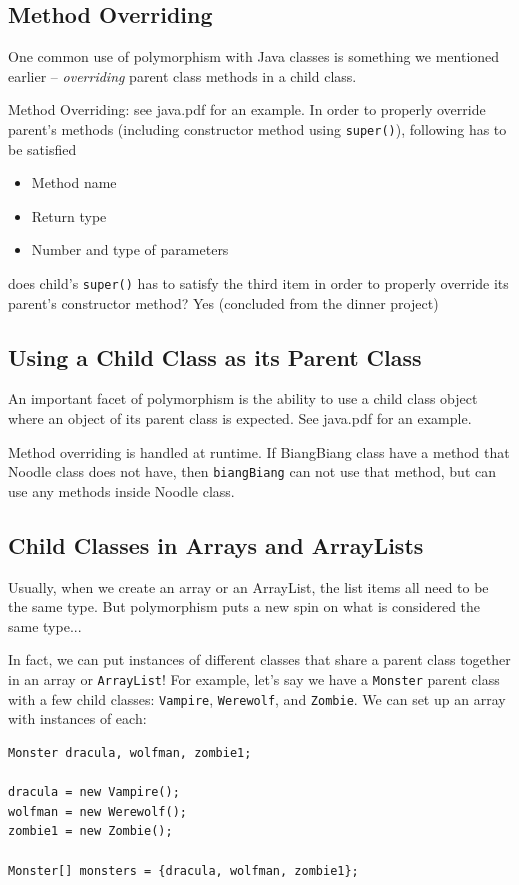 \documentclass[a4paper, 12pt]{article}
\begin{document}
\subsection{Method Overriding}
One common use of polymorphism with Java classes is something we mentioned earlier -- \textit{overriding} parent class methods in a child class.

Method Overriding: see java.pdf for an example. In order to properly override parent's methods {\color{red}(including constructor method using \verb|super()|)}, following has to be satisfied
\begin{itemize}
\item Method name

\item Return type

\item Number and type of parameters

\end{itemize}
does child's \verb|super()| has to satisfy the third item in order to properly override its parent's constructor method? Yes (concluded from the dinner project)

\subsection{Using a Child Class as its Parent Class}
An important facet of polymorphism is the ability to use a child class object where an object of its parent class is expected. See java.pdf for an example.

Method overriding is handled at runtime. If BiangBiang class have a method that Noodle class does	not have, then \verb|biangBiang| can not use that method, but can use any methods inside Noodle class.

\subsection{Child Classes in Arrays and ArrayLists}
Usually, when we create an array or an ArrayList, the list items all need to be the same type. But polymorphism puts a new spin on what is considered the same type...

In fact, we can put instances of different classes that share a parent class together in an array or \verb|ArrayList|! For example, let's say we have a \verb|Monster| parent class with a few child classes: \verb|Vampire|, \verb|Werewolf|, and \verb|Zombie|. We can set up an array with instances of each:
\begin{verbatim}
Monster dracula, wolfman, zombie1;

dracula = new Vampire();
wolfman = new Werewolf();
zombie1 = new Zombie();

Monster[] monsters = {dracula, wolfman, zombie1};
\end{verbatim}
\end{document}
